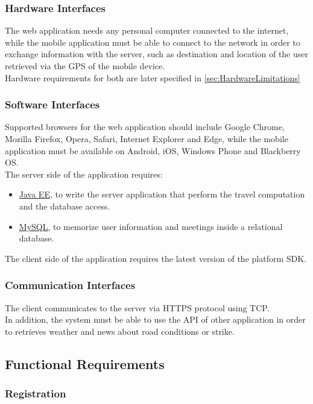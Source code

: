 \subsubsection{Hardware Interfaces}
The web application needs any personal computer connected to the internet, while the mobile application must be able to connect to the network in order to exchange information with the server, such as destination and location of the user retrieved via the GPS of the mobile device.\\
Hardware requirements for both are later specified in \autoref{sec:HardwareLimitations}
\clearpage
\subsubsection{Software Interfaces}
\label{sec:SoftwareInterfaces}
Supported browsers for the web application should include Google Chrome, Mozilla Firefox, Opera, Safari, Internet Explorer and Edge, while the mobile application must be available on Android, iOS, Windows Phone and Blackberry OS.\\
The server side of the application requires: 
\begin{itemize}
	\item \href{http://www.oracle.com/technetwork/java/javaee/overview/index.html}{Java EE}, to write the server application that perform the travel computation and the database access.
	\item \href{https://dev.mysql.com/}{MySQL}, to memorize user information and meetings inside a relational database.
\end{itemize}
The client side of the application requires the latest version of the platform SDK.
\subsubsection{Communication Interfaces}
The client communicates to the server via HTTPS protocol using TCP.\\
In addition, the system must be able to use the API of other application in order to retrieves weather and news about road conditions or strike.

\clearpage

\subsection{Functional Requirements}
\subsubsection{Registration}
